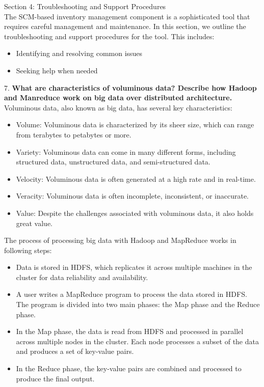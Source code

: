 \documentclass[12pt]{article}
\begin{document}
\begin{enumerate}
\begin{enumerate}
Section 4: Troubleshooting and Support Procedures\\
The SCM-based inventory management component is a sophisticated tool that requires careful management and maintenance. In this section, we outline the troubleshooting and support procedures for the tool. This includes:
\begin{itemize}
    \item Identifying and resolving common issues
    \item Seeking help when needed
\end{itemize}
\end{enumerate}
    7. {\bfseries What are characteristics of voluminous data? Describe how Hadoop and Manreduce work on big data over distributed architecture.\\}
    Voluminous data, also known as big data, has several key characteristics:
    \begin{itemize}
        \item Volume: Voluminous data is characterized by its sheer size, which can range from terabytes to petabytes or more.
        \item Variety: Voluminous data can come in many different forms, including structured data, unstructured data, and semi-structured data.
        \item Velocity: Voluminous data is often generated at a high rate and in real-time.
        \item Veracity: Voluminous data is often incomplete, inconsistent, or inaccurate.
        \item Value: Despite the challenges associated with voluminous data, it also holds great value.
        \end{itemize}
        The process of processing big data with Hadoop and MapReduce works in following steps:
        \begin{itemize}
            \item Data is stored in HDFS, which replicates it across multiple machines in the cluster for data reliability and availability.
            \item A user writes a MapReduce program to process the data stored in HDFS. The program is divided into two main phases: the Map phase and the Reduce phase.
            \item In the Map phase, the data is read from HDFS and processed in parallel across multiple nodes in the cluster. Each node processes a subset of the data and produces a set of key-value pairs.
            \item In the Reduce phase, the key-value pairs are combined and processed to produce the final output.

\end{itemize}
\end{enumerate}
\end{document}
